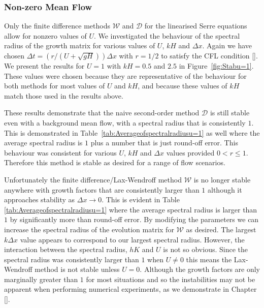 \subsubsection{Non-zero Mean Flow}
Only the finite difference methods $\mathcal{W}$ and $\mathcal{D}$ for the linearised Serre equations allow for nonzero values of $U$. We investigated the behaviour of the spectral radius of the growth matrix for various values of $U$, $kH$ and $\Delta x$. Again we have chosen $\Delta t =   \left( r / \left(U + \sqrt{gH}\right) \right) {\Delta x} $ with $r= 1/2$ to satisfy the CFL condition []. We present the results for $U =1$ with $kH =0.5$ and $2.5$ in Figure~\ref{fig:Stabu=1}. These values were chosen because they are representative of the behaviour for both methods for most values of $U$ and $kH$, and because these values of $kH$ match those used in the results above.

These results demonstrate that the naive second-order method $\mathcal{D}$ is still stable even with a background mean flow, with a spectral radius that is consistently $1$. This is demonstrated in Table~\ref{tab:Averageofspectralradiusu=1} as well where the average spectral radius is $1$ plus a number that is just round-off error. This behaviour was consistent for various $U$, $kH$ and $\Delta x$ values provided $0 < r \le 1$. Therefore this method is stable as desired for a range of flow scenarios. 

Unfortunately the finite difference/Lax-Wendroff method $\mathcal{W}$ is no longer stable anywhere with growth factors that are consistently larger than $1$ although it approaches stability as $\Delta x \rightarrow 0$. This is evident in Table \ref{tab:Averageofspectralradiusu=1} where the average spectral radius is larger than $1$ by significantly more than round-off error. By modifying the parameters we can increase the spectral radius of the evolution matrix for $\mathcal{W}$ as desired. The largest $k\Delta x$ value appears to correspond to our largest spectral radius. However, the interaction between the spectral radius, $hK$ and $U$ is not so obvious. Since the spectral radius was consistently larger than $1$ when $U \neq 0$ this means the Lax-Wendroff method is not stable unless $U=0$. Although the growth factors are only marginally greater than $1$ for most situations and so the instabilities may not be apparent when performing numerical experiments, as we demonstrate in Chapter []. 

